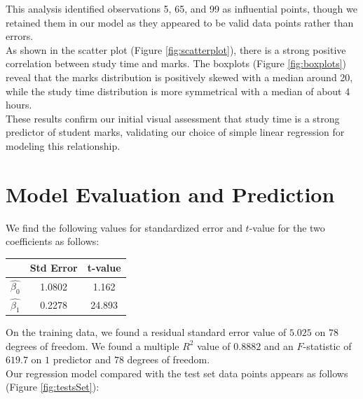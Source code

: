 \documentclass{article}
\begin{document}
\noindent This analysis identified observations 5, 65, and 99 as influential points, though we retained them in our model as they appeared to be valid data points rather than errors.\\


\noindent As shown in the scatter plot (Figure \ref{fig:scatterplot}), there is a strong positive correlation between study time and marks. The boxplots (Figure \ref{fig:boxplots}) reveal that the marks distribution is positively skewed with a median around 20, while the study time distribution is more symmetrical with a median of about 4 hours. \\

\noindent These results confirm our initial visual assessment that study time is a strong predictor of student marks, validating our choice of simple linear regression for modeling this relationship.

\section{Model Evaluation and Prediction}
We find the following values for standardized error and $t$-value for the two coefficients as follows:

\begin{center}
  \begin{tabular}{c | c c}
    & Std Error & t-value \\
    \hline
    $\hat{\beta_0}$ & 1.0802 & 1.162 \\
    $\hat{\beta_1}$ & 0.2278 & 24.893
  \end{tabular}
\end{center}

\noindent On the training data, we found a residual standard error value of $5.025$ on $78$ degrees of freedom. We found a multiple $R^2$ value of $0.8882$ and an $F$-statistic of $619.7$ on $1$ predictor and $78$ degrees of freedom. \\

\noindent Our regression model compared with the test set data points appears as follows (Figure \ref{fig:testsSet}):
\end{document}
